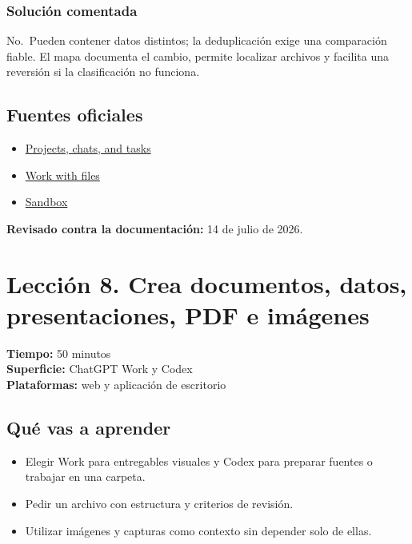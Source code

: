\documentclass[10pt,a4paper,openany]{book}
\providecommand{\tightlist}{\setlength{\itemsep}{0.18em}\setlength{\parskip}{0pt}}
\begin{document}
\subsubsection{Solución comentada}\label{soluciuxf3n-comentada-7}

No.~Pueden contener datos distintos; la deduplicación exige una
comparación fiable. El mapa documenta el cambio, permite localizar
archivos y facilita una reversión si la clasificación no funciona.

\subsection{Fuentes oficiales}\label{fuentes-oficiales-6}

\begin{itemize}
\tightlist
\item
  \href{https://learn.chatgpt.com/docs/projects}{Projects, chats, and
  tasks}
\item
  \href{https://learn.chatgpt.com/docs/artifacts-viewer}{Work with
  files}
\item
  \href{https://learn.chatgpt.com/docs/sandboxing}{Sandbox}
\end{itemize}

\textbf{Revisado contra la documentación:} 14 de julio de 2026.

\clearpage

\section{Lección 8. Crea documentos, datos, presentaciones, PDF e
imágenes}\label{lecciuxf3n-8.-crea-documentos-datos-presentaciones-pdf-e-imuxe1genes}

\begin{metabox}

\textbf{Tiempo:} 50 minutos\\
\textbf{Superficie:} ChatGPT Work y Codex\\
\textbf{Plataformas:} web y aplicación de escritorio

\end{metabox}

\subsection{Qué vas a aprender}\label{quuxe9-vas-a-aprender-7}

\begin{itemize}
\tightlist
\item
  Elegir Work para entregables visuales y Codex para preparar fuentes o
  trabajar en una carpeta.
\item
  Pedir un archivo con estructura y criterios de revisión.
\item
  Utilizar imágenes y capturas como contexto sin depender solo de ellas.
\end{itemize}
\end{document}
